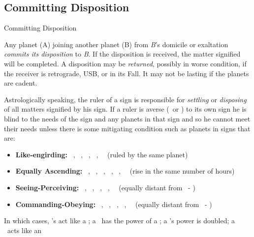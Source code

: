 \subsection{Committing Disposition}
\begin{frame}[t]{Committing Disposition}
\small
\begin{block}{}
Any planet (A) joining another planet (B) from \textsl{B}'s domicile or exaltation \textsl{commits its disposition} to \textsl{B}. If the disposition is received, the matter signified will be completed. A disposition may be \textsl{returned}, possibly in worse condition, if the receiver is retrograde, USB, or in its Fall.  It may not be lasting if the planets are cadent.
\end{block}

Astrologically speaking, the ruler of a sign is responsible for \textsl{settling} or \textsl{disposing} of all matters signified by his sign. If a ruler is averse (\Semisextile\ or \Quincunx) to its own sign he is blind to the needs of the sign and any planets in that sign and so he cannot meet their needs unless there is some mitigating condition such as planets in signs that are:\footnotemark[1]
\vspace{-0.25cm}
\begin{itemize}
\item \textbf{Like-engirding:}  \Aries\ \Scorpio, \Taurus\  \Libra, \Gemini\ \Virgo, \Sagittarius\ \Pisces,  \Capricorn\ \Aquarius\ (ruled by the same planet)

\item \textbf{Equally Ascending:}  \Aries\ \Pisces, \Taurus\ \Aquarius, \Gemini\ \Capricorn, \Cancer\ \Sagittarius, \Leo\ \Scorpio, \Virgo\ \Libra\ (rise in the same number of hours)

\item \textbf{Seeing-Perceiving:} \Aries\ \Libra, \Taurus\ \Virgo, \Gemini\ \Leo, \Scorpio\ \Pisces, \Sagittarius\ \Aquarius\ (equally distant from \Cancer\ - \Capricorn)

\item \textbf{Commanding-Obeying:} \Taurus\ \Pisces, \Gemini\ \Aquarius, \Cancer\ \Capricorn, \Leo\ \Sagittarius, \Virgo\ \Scorpio\ (equally distant from \Aries\ - \Libra)
\end{itemize}
\vspace{-0.25cm}
In which cases, \Semisextile's act like a \Conjunction; a \Sextile\ has the power of a \Trine; a \Square's power is doubled; a \Quincunx\ acts like an \Opposition
{}

\end{frame}
